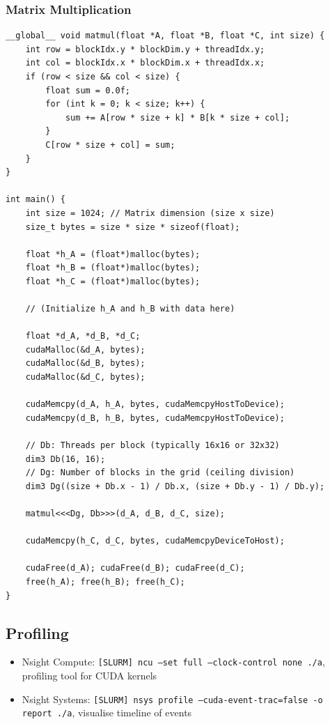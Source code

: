 \documentclass{article}
\begin{document}
\subsubsection{Matrix Multiplication}
\begin{lstlisting}
__global__ void matmul(float *A, float *B, float *C, int size) {
    int row = blockIdx.y * blockDim.y + threadIdx.y;
    int col = blockIdx.x * blockDim.x + threadIdx.x;
    if (row < size && col < size) {
        float sum = 0.0f;
        for (int k = 0; k < size; k++) {
            sum += A[row * size + k] * B[k * size + col];
        }
        C[row * size + col] = sum;
    }
}

int main() {
    int size = 1024; // Matrix dimension (size x size)
    size_t bytes = size * size * sizeof(float);

    float *h_A = (float*)malloc(bytes);
    float *h_B = (float*)malloc(bytes);
    float *h_C = (float*)malloc(bytes);

    // (Initialize h_A and h_B with data here)

    float *d_A, *d_B, *d_C;
    cudaMalloc(&d_A, bytes);
    cudaMalloc(&d_B, bytes);
    cudaMalloc(&d_C, bytes);

    cudaMemcpy(d_A, h_A, bytes, cudaMemcpyHostToDevice);
    cudaMemcpy(d_B, h_B, bytes, cudaMemcpyHostToDevice);

    // Db: Threads per block (typically 16x16 or 32x32)
    dim3 Db(16, 16); 
    // Dg: Number of blocks in the grid (ceiling division)
    dim3 Dg((size + Db.x - 1) / Db.x, (size + Db.y - 1) / Db.y);

    matmul<<<Dg, Db>>>(d_A, d_B, d_C, size);

    cudaMemcpy(h_C, d_C, bytes, cudaMemcpyDeviceToHost);

    cudaFree(d_A); cudaFree(d_B); cudaFree(d_C);
    free(h_A); free(h_B); free(h_C);
}
\end{lstlisting}

\subsection{Profiling}
\begin{itemize}
    \item Nsight Compute: \texttt{[SLURM] ncu --set full --clock-control none ./a}, profiling tool for CUDA kernels
    \item Nsight Systems: \texttt{[SLURM] nsys profile --cuda-event-trac=false -o report ./a}, visualise timeline of events
\end{itemize}
\end{document}
